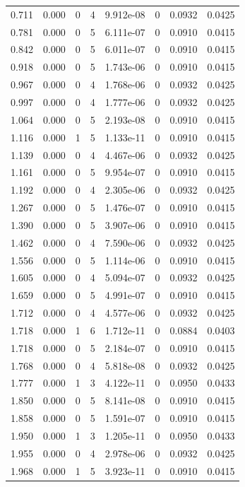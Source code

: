 \documentclass[preview]{standalone}
\begin{document}
{{\begin{tabular}{L{1.2cm}C{1.2cm} C{0.3cm}C{0.5cm} C{1.4cm}C{1.4cm} C{1.4cm}C{1.4cm}}
  0.711  &  0.000  & 0     &  4 &  9.912e-08  & 0  & 0.0932 &  0.0425   \\ 
  0.781  &  0.000  & 0     &  5 &  6.111e-07  & 0  & 0.0910 &  0.0415   \\ 
  0.842  &  0.000  & 0     &  5 &  6.011e-07  & 0  & 0.0910 &  0.0415   \\ 
  0.918  &  0.000  & 0     &  5 &  1.743e-06  & 0  & 0.0910 &  0.0415   \\ 
  0.967  &  0.000  & 0     &  4 &  1.768e-06  & 0  & 0.0932 &  0.0425   \\ 
  0.997  &  0.000  & 0     &  4 &  1.777e-06  & 0  & 0.0932 &  0.0425   \\ 
  1.064  &  0.000  & 0     &  5 &  2.193e-08  & 0  & 0.0910 &  0.0415   \\ 
  1.116  &  0.000  & 1     &  5 &  1.133e-11  & 0  & 0.0910 &  0.0415   \\ 
  1.139  &  0.000  & 0     &  4 &  4.467e-06  & 0  & 0.0932 &  0.0425   \\ 
  1.161  &  0.000  & 0     &  5 &  9.954e-07  & 0  & 0.0910 &  0.0415   \\ 
  1.192  &  0.000  & 0     &  4 &  2.305e-06  & 0  & 0.0932 &  0.0425   \\ 
  1.267  &  0.000  & 0     &  5 &  1.476e-07  & 0  & 0.0910 &  0.0415   \\ 
  1.390  &  0.000  & 0     &  5 &  3.907e-06  & 0  & 0.0910 &  0.0415   \\ 
  1.462  &  0.000  & 0     &  4 &  7.590e-06  & 0  & 0.0932 &  0.0425   \\ 
  1.556  &  0.000  & 0     &  5 &  1.114e-06  & 0  & 0.0910 &  0.0415   \\ 
  1.605  &  0.000  & 0     &  4 &  5.094e-07  & 0  & 0.0932 &  0.0425   \\ 
  1.659  &  0.000  & 0     &  5 &  4.991e-07  & 0  & 0.0910 &  0.0415   \\ 
  1.712  &  0.000  & 0     &  4 &  4.577e-06  & 0  & 0.0932 &  0.0425   \\ 
  1.718  &  0.000  & 1     &  6 &  1.712e-11  & 0  & 0.0884 &  0.0403   \\ 
  1.718  &  0.000  & 0     &  5 &  2.184e-07  & 0  & 0.0910 &  0.0415   \\ 
  1.768  &  0.000  & 0     &  4 &  5.818e-08  & 0  & 0.0932 &  0.0425   \\ 
  1.777  &  0.000  & 1     &  3 &  4.122e-11  & 0  & 0.0950 &  0.0433   \\ 
  1.850  &  0.000  & 0     &  5 &  8.141e-08  & 0  & 0.0910 &  0.0415   \\ 
  1.858  &  0.000  & 0     &  5 &  1.591e-07  & 0  & 0.0910 &  0.0415   \\ 
  1.950  &  0.000  & 1     &  3 &  1.205e-11  & 0  & 0.0950 &  0.0433   \\ 
  1.955  &  0.000  & 0     &  4 &  2.978e-06  & 0  & 0.0932 &  0.0425   \\ 
  1.968  &  0.000  & 1     &  5 &  3.923e-11  & 0  & 0.0910 &  0.0415   \\ 
\hline 
\end{tabular} 

}}
\end{document}
